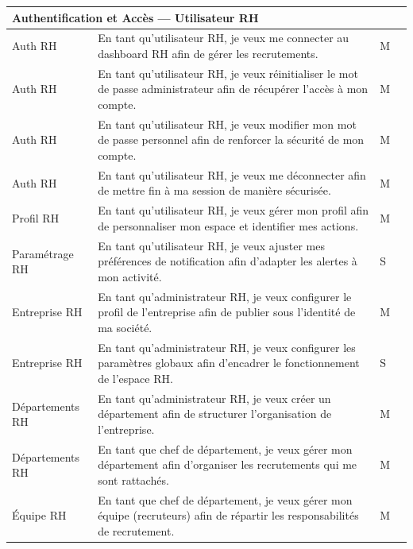 \begin{small}
\begin{longtable}{|p{2.5cm}|p{6.8cm}|>{\centering\arraybackslash}p{2.2cm}|>{\centering\arraybackslash}p{2.2cm}|}
\multicolumn{4}{|l|}{\cellcolor[HTML]{F2F2F2}\textbf{Authentification et Accès — Utilisateur RH}} \\ \hline
Auth RH & En tant qu'utilisateur RH, je veux me connecter au dashboard RH afin de gérer les recrutements. & M & 2 \\ \hline
Auth RH & En tant qu'utilisateur RH, je veux réinitialiser le mot de passe administrateur afin de récupérer l'accès à mon compte. & M & 2 \\ \hline
Auth RH & En tant qu'utilisateur RH, je veux modifier mon mot de passe personnel afin de renforcer la sécurité de mon compte. & M & 2 \\ \hline
Auth RH & En tant qu'utilisateur RH, je veux me déconnecter afin de mettre fin à ma session de manière sécurisée. & M & 1 \\ \hline
Profil RH & En tant qu'utilisateur RH, je veux gérer mon profil afin de personnaliser mon espace et identifier mes actions. & M & 3 \\ \hline
Paramétrage RH & En tant qu'utilisateur RH, je veux ajuster mes préférences de notification afin d'adapter les alertes à mon activité. & S & 2 \\ \hline
Entreprise RH & En tant qu'administrateur RH, je veux configurer le profil de l'entreprise afin de publier sous l'identité de ma société. & M & 3 \\ \hline
Entreprise RH & En tant qu'administrateur RH, je veux configurer les paramètres globaux afin d'encadrer le fonctionnement de l'espace RH. & S & 2 \\ \hline
Départements RH & En tant qu'administrateur RH, je veux créer un département afin de structurer l'organisation de l'entreprise. & M & 3 \\ \hline
Départements RH & En tant que chef de département, je veux gérer mon département afin d'organiser les recrutements qui me sont rattachés. & M & 3 \\ \hline
Équipe RH & En tant que chef de département, je veux gérer mon équipe (recruteurs) afin de répartir les responsabilités de recrutement. & M & 3 \\ \hline


\end{longtable}
\end{small}
